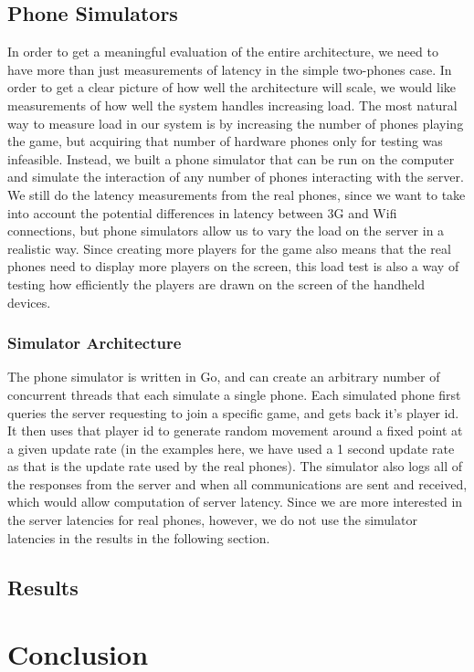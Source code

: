 \documentclass{acm_proc_article-sp}
\begin{document}
\subsection{Phone Simulators}
In order to get a meaningful evaluation of the entire architecture, we need to have more than just measurements of latency in the simple two-phones case.  In order to get a clear picture of how well the architecture will scale, we would like measurements of how well the system handles increasing load.  The most natural way to measure load in our system is by increasing the number of phones playing the game, but acquiring that number of hardware phones only for testing was infeasible.  Instead, we built a phone simulator that can be run on the computer and simulate the interaction of any number of phones interacting with the server. We still do the latency measurements from the real phones, since we want to take into account the potential differences in latency between 3G and Wifi connections, but phone simulators allow us to vary the load on the server in a realistic way. Since creating more players for the game also means that the real phones need to display more players on the screen, this load test is also a way of testing how efficiently the players are drawn on the screen of the handheld devices.

\subsubsection{Simulator Architecture}
The phone simulator is written in Go, and can create an arbitrary number of concurrent threads that each simulate a single phone.  Each simulated phone first queries the server requesting to join a specific game, and gets back it's player id.  It then uses that player id to generate random movement around a fixed point at a given update rate (in the examples here, we have used a 1 second update rate as that is the update rate used by the real phones). The simulator also logs all of the responses from the server and when all communications are sent and received, which would allow computation of server latency.  Since we are more interested in the server latencies for real phones, however, we do not use the simulator latencies in the results in the following section.

\subsection{Results}

\section{Conclusion}


\end{document}
